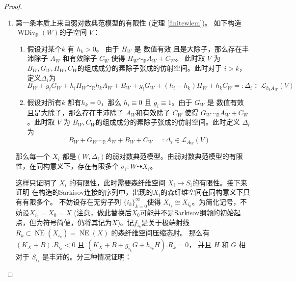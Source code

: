 \begin{proof}
  \begin{enumerate}
    \item 第一条本质上来自弱对数典范模型的有限性 (定理 \ref{finitewlcm})。  如下构造 $\operatorname{WDiv}_{\mathbb{R}}(W)$的子空间 $V$：
      \begin{enumerate}
        \item 假设对某个$k$ 有  $h_{k}>0$。 由于 $H_{W}$ 是 数值有效 且是大除子，那么存在丰沛除子 $A_{W}$ 和有效除子 $C_{W}$  使得 $H_{W}\sim_{\mathbb{R}}A_{W}+C_{W}$。 此时取 $V$ 为  $B_{W},G_{W},H_{W},C_{W}$的组成成分的素除子张成的仿射空间。此时对于 $i>k$，定义$\Delta_{i}$为
              \[ B_{W}+g_{i}G_{W}+h_{i}H_{W}\sim_{\mathbb{R}} h_{k}A_{W}+B_{W}+g_{i}G_{W}+(h_{i}-h_{k})H_{W}+h_{k}C_{W}=:\Delta_{i} \in \mathcal{L}_{h_{k}A_{W}}(V) \]
        \item 假设对所有$k$ 都有$h_{k}=0$，那么  $h_{i}\equiv 0$ 且 $g_{i}\equiv 1$。由于  $G_{W}$ 是 数值有效 且是大除子，那么存在丰沛除子 $A_{W}$和有效除子 $C_{W}$ 使得 $G_{W}\sim_{\mathbb{R}}A_{W}+C_{W}$。此时取 $V$ 为  $B_{W},C_{W}$的组成成分的素除子张成的仿射空间。此时定义 $\Delta_{i}$为
              \[ B_{W}+G_{W}\sim_{\mathbb{R}} A_{W}+B_{W}+C_{W}=:\Delta_{i} \in \mathcal{L}_{A_{W}}(V) \]
      \end{enumerate}
          那么每一个 $X_{i}$ 都是$(W,\Delta_{i})$的弱对数典范模型。由弱对数典范模型的有限性，在同构意义下，存在有限多个 $\sigma_{i}: W\dashrightarrow X_{i}$。

          这样只证明了 $X_{i}$ 的有限性，此时需要森纤维空间 $X_{i}\to S_{i}$的有限性。接下来证明 在构造的Sarkisov连接的序列中，出现的$X_{i}$的森纤维空间在同构意义下只有有限多个。
          不妨设存在无穷子列 $\{i_{k}\}_{k=0}^{\infty} $使得 $X_{i_{k}}\cong X_{i_{0}}$。为简化记号，不妨设$X_{i_{0}}=X_{0}=X$ (注意，做此替换后$X_{0}$可能并不是Sarkisov纲领的初始起点，但为符号简便，仍将其记为$X$)。记$f_{i_{k}}$是关于极端射线 $R_{k} \subset \overline{\operatorname{NE}}(X_{i_{k}})= \overline{\operatorname{NE}}(X) $ 的森纤维空间压缩态射。 那么有
          $(K_{X}+B).R_{i_{k}}<0  $ 且 $(K_{X}+B+g_{i_{k}}G+h_{i_{k}}H).R_{k}=0$， 并且 $H$ 和 $G$ 相对于 $S_{i_{k}}$ 是丰沛的。分三种情况证明：
      \begin{enumerate}


\end{enumerate}
\end{enumerate}
\end{proof}
